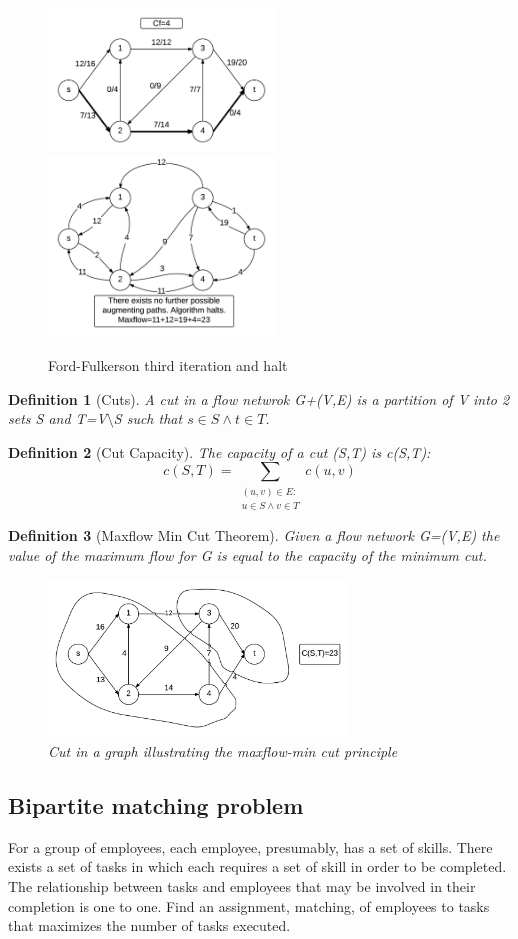 \documentclass[12pt,letterpaper]{article}
\newtheorem{definition}{Definition}[section]
\begin{document}
\begin{figure}[h]
\centering
\includegraphics[width=6cm]{mf2f}
\includegraphics[width=6cm]{mf2r}
\caption{Ford-Fulkerson third iteration and halt}
\end{figure}
\FloatBarrier
\begin{definition}[Cuts]
A cut in a flow netwrok G+(V,E) is a partition of V into 2 sets S and T=V$\setminus$S such that $s\in S \wedge t\in T$.
\end{definition}
\begin{definition}[Cut Capacity]
The capacity of a cut (S,T) is c(S,T):
\[c(S,T)=\sum_{\substack{(u,v)\in E:\\ u\in S \wedge v\in T}}c(u,v)\]
\end{definition}
\begin{definition}[Maxflow Min Cut Theorem]
Given a flow network G=(V,E) the value of the maximum flow for G is equal to the capacity of the minimum cut.
\begin{figure}[h]
\centering
\includegraphics[width=8cm]{maxflowmincut}
\caption{Cut in a graph illustrating the maxflow-min cut principle}
\end{figure}
\end{definition}
\subsection{Bipartite matching problem}
For a group of employees, each employee, presumably, has a set of skills. There exists a set of tasks in which each requires a set of skill in order to be completed. The relationship between tasks and employees that may be involved in their completion is one to one. Find an assignment, matching, of employees to tasks that maximizes the number of tasks executed. 
\end{document}
